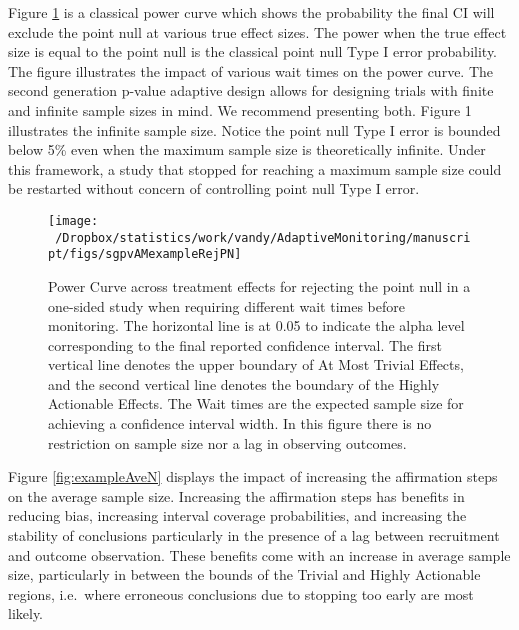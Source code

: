 \documentclass[12pt,oneside]{book}
\newlength{\li}\setlength{\li}{14.48pt}
\newlength{\di}\setlength{\di}{-3.5mm}
\theoremstyle{definition}
\theoremstyle{definition}
\theoremstyle{definition}
\theoremstyle{remark}
\begin{document}
Figure \ref{fig:exampleRejPN} is a classical power curve which shows the
probability the final CI will exclude the point null at various true
effect sizes. The power when the true effect size is equal to the point
null is the classical point null Type I error probability. The figure
illustrates the impact of various wait times on the power curve. The
second generation p-value adaptive design allows for designing trials
with finite and infinite sample sizes in mind. We recommend presenting
both. Figure 1 illustrates the infinite sample size. Notice the point
null Type I error is bounded below 5\% even when the maximum sample size
is theoretically infinite. Under this framework, a study that stopped
for reaching a maximum sample size could be restarted without concern of
controlling point null Type I error.

\begin{figure}[H]

{\centering \texttt{[image: ~/Dropbox/statistics/work/vandy/AdaptiveMonitoring/manuscript/figs/sgpvAMexampleRejPN]} 

}

\caption{Power Curve across treatment effects for rejecting the point null in a one-sided study when requiring different wait times before monitoring.  The horizontal line is at 0.05 to indicate the alpha level corresponding to the final reported confidence interval.  The first vertical line denotes the upper boundary of At Most Trivial Effects, and the second vertical line denotes the boundary of the Highly Actionable Effects.  The Wait times are the expected sample size for achieving a confidence interval width.  In this figure there is no restriction on sample size nor a lag in observing outcomes.}\label{fig:exampleRejPN}
\end{figure}

Figure \ref{fig:exampleAveN} displays the impact of increasing the
affirmation steps on the average sample size. Increasing the affirmation
steps has benefits in reducing bias, increasing interval coverage
probabilities, and increasing the stability of conclusions particularly
in the presence of a lag between recruitment and outcome observation.
These benefits come with an increase in average sample size,
particularly in between the bounds of the Trivial and Highly Actionable
regions, i.e.~where erroneous conclusions due to stopping too early are
most likely.
\end{document}
